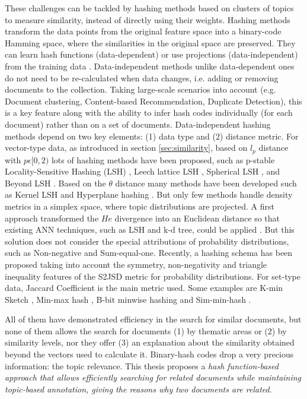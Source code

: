 These challenges can be tackled by hashing methods based on clusters of topics to measure similarity, instead of directly using their weights. Hashing methods transform the data points from the original feature space into a binary-code Hamming space, where the similarities in the original space are preserved. They can learn hash functions (data-dependent) or use projections (data-independent) from the training data \cite{Wang2016}. Data-independent methods unlike data-dependent ones do not need to be re-calculated when data changes, i.e. adding or removing documents to the collection. Taking large-scale scenarios into account (e.g. Document clustering, Content-based Recommendation, Duplicate Detection), this is a key feature along with the ability to infer hash codes individually (for each document) rather than on a set of documents. Data-independent hashing methods depend on two key elements: (1) data type and (2) distance metric. For vector-type data, as introduced in section \ref{sec:similarity}, based on $l_p$ distance with $p \epsilon [0,2)$ lots of hashing methods have been proposed, such as p-stable Locality-Sensitive Hashing (LSH) \cite{Datar2004}, Leech lattice LSH \cite{Andoni2006}, Spherical LSH \cite{Terasawa2007}, and Beyond LSH \cite{Andoni2014}. Based on the $\theta$ distance many methods have been developed such as Kernel LSH \cite{Kulis2012} and Hyperplane hashing \cite{Vijayanarasimhan2014}. But only few methods handle density metrics in a simplex space, where topic distributions are projected. A first approach transformed the $He$ divergence into an Euclidean distance so that existing ANN techniques, such as LSH and k-d tree, could be applied \cite{Krstovski2013a}. But this solution does not consider the special attributions of probability distributions, such as Non-negative and Sum-equal-one. Recently, a hashing schema \cite{Mao2017} has been proposed taking into account the symmetry, non-negativity and triangle inequality features of the S2JSD metric for probability distributions. For set-type data, Jaccard Coefficient is the main metric used. Some examples are K-min Sketch \cite{Li2012}, Min-max hash \cite{Ji2013}, B-bit minwise hashing \cite{Li2010b} and Sim-min-hash \cite{Zhao2013}.

All of them have demonstrated efficiency in the search for similar documents, but none of them allows the search for documents (1) by thematic areas or (2) by similarity levels, nor they offer (3) an explanation about the similarity obtained beyond the vectors used to calculate it. Binary-hash codes drop a very precious information: the topic relevance. This thesis proposes a \textit{hash function-based approach that allows efficiently searching for related documents while maintaining topic-based annotation, giving the reasons why two documents are related}.


